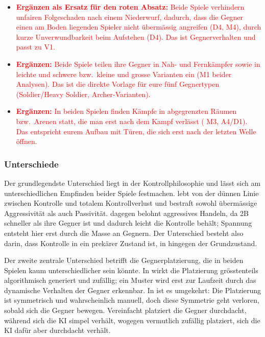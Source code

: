 \documentclass[../Main.tex]{subfiles}
\begin{document}
\begin{itemize}[leftmargin=1.5cm]
    \item \textcolor{red}{\textbf{Ergänzen als Ersatz für den roten Absatz:} Beide Spiele verhindern unfairen Folgeschaden nach einem Niederwurf,  dadurch, dass die Gegner einen am Boden liegenden Spieler nicht übermässig angreifen (D4, M4),  durch kurze Unverwundbarkeit beim Aufstehen (D4). Das ist Gegnerverhalten und passt zu V1.}
    \item \textcolor{red}{\textbf{Ergänzen:} Beide Spiele teilen ihre Gegner in Nah- und Fernkämpfer sowie in leichte und schwere bzw.\ kleine und grosse Varianten ein (M1 beider Analysen). Das ist die direkte Vorlage für eure fünf Gegnertypen (Soldier/Heavy Soldier, Archer-Varianten).}
    \item \textcolor{red}{\textbf{Ergänzen:} In beiden Spielen finden Kämpfe in abgegrenzten Räumen bzw.\ Arenen statt, die man erst nach dem Kampf verlässt ( M3,  A4/D1). Das entspricht eurem Aufbau mit Türen, die sich erst nach der letzten Welle öffnen.}
\end{itemize}

\subsubsection{Unterschiede}

Der grundlegendste Unterschied liegt in der Kontrollphilosophie und lässt sich am unterschiedlichen Empfinden beider Spiele festmachen.  lebt von der dünnen Linie zwischen Kontrolle und totalem Kontrollverlust und bestraft sowohl übermässige Aggressivität als auch Passivität.  dagegen belohnt aggressives Handeln, da 2B schneller als ihre Gegner ist und dadurch leicht die Kontrolle behält; Spannung entsteht hier erst durch die Masse an Gegnern. Der Unterschied besteht also darin, dass Kontrolle in  ein prekärer Zustand ist, in  hingegen der Grundzustand.

Der zweite zentrale Unterschied betrifft die Gegnerplatzierung, die in beiden Spielen kaum unterschiedlicher sein könnte. In  wirkt die Platzierung grösstenteils algorithmisch generiert und zufällig; ein Muster wird erst zur Laufzeit durch das dynamische Verhalten der Gegner erkennbar. In  ist es umgekehrt: Die Platzierung ist symmetrisch und wahrscheinlich manuell, doch diese Symmetrie geht verloren, sobald sich die Gegner bewegen. Vereinfacht platziert  die Gegner durchdacht, während sich die KI simpel verhält, wogegen  vermutlich zufällig platziert, sich die KI dafür aber durchdacht verhält.
\end{document}

